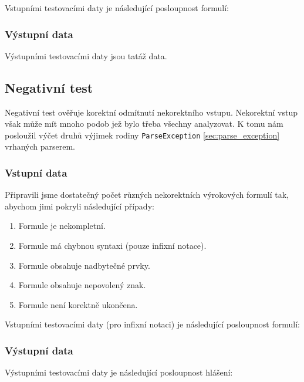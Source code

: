\documentclass[thesis=B,czech,hidelinks]{thesis}[2012/06/26]
\begin{document}
Vstupními testovacími daty je následující posloupnost formulí:



\subsubsection{Výstupní data}

Výstupními testovacími daty jsou tatáž data.

\subsection{Negativní test}

Negativní test ověřuje korektní odmítnutí nekorektního vstupu. Nekorektní vstup však může mít mnoho podob jež bylo třeba všechny analyzovat. K tomu nám posloužil výčet druhů výjimek rodiny \texttt{ParseException} \ref{sec:parse_exception} vrhaných parserem.

\subsubsection{Vstupní data}

Připravili jsme dostatečný počet různých nekorektních výrokových formulí tak, abychom jimi pokryli následující případy:

\begin{enumerate}
	\item Formule je nekompletní.
	\item Formule má chybnou syntaxi (pouze infixní notace).
	\item Formule obsahuje nadbytečné prvky.
	\item Formule obsahuje nepovolený znak.
	\item Formule není korektně ukončena.
\end{enumerate}

Vstupními testovacími daty (pro infixní notaci) je následující posloupnost formulí:



\subsubsection{Výstupní data}

Výstupními testovacími daty je následující posloupnost hlášení:


\end{document}
